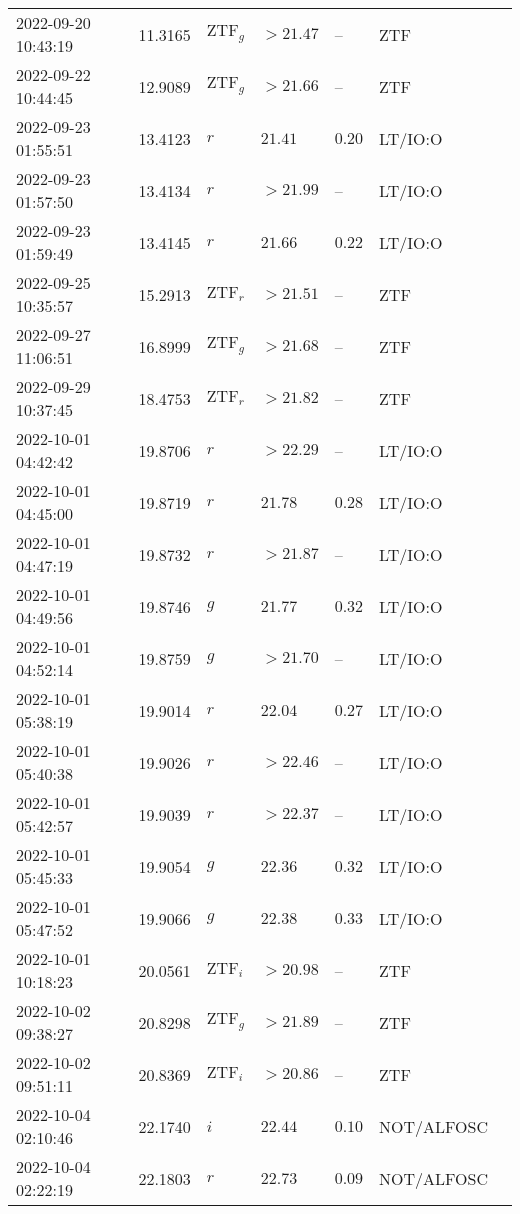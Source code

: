 \documentclass{nature_plusfigure}
\begin{document}
\begin{supplement}
\begin{center}
\begin{longtable}{lllllll}
2022-09-20 10:43:19 & 11.3165 & $\mathrm{ZTF}_{g}$ & $>21.47$ & -- & ZTF &  \\ 
2022-09-22 10:44:45 & 12.9089 & $\mathrm{ZTF}_{g}$ & $>21.66$ & -- & ZTF &  \\ 
2022-09-23 01:55:51 & 13.4123 & $r$ & $21.41$ & $0.20$ & LT/IO:O &  \\ 
2022-09-23 01:57:50 & 13.4134 & $r$ & $>21.99$ & -- & LT/IO:O &  \\ 
2022-09-23 01:59:49 & 13.4145 & $r$ & $21.66$ & $0.22$ & LT/IO:O &  \\ 
2022-09-25 10:35:57 & 15.2913 & $\mathrm{ZTF}_{r}$ & $>21.51$ & -- & ZTF &  \\ 
2022-09-27 11:06:51 & 16.8999 & $\mathrm{ZTF}_{g}$ & $>21.68$ & -- & ZTF &  \\ 
2022-09-29 10:37:45 & 18.4753 & $\mathrm{ZTF}_{r}$ & $>21.82$ & -- & ZTF &  \\ 
2022-10-01 04:42:42 & 19.8706 & $r$ & $>22.29$ & -- & LT/IO:O &  \\ 
2022-10-01 04:45:00 & 19.8719 & $r$ & $21.78$ & $0.28$ & LT/IO:O &  \\ 
2022-10-01 04:47:19 & 19.8732 & $r$ & $>21.87$ & -- & LT/IO:O &  \\ 
2022-10-01 04:49:56 & 19.8746 & $g$ & $21.77$ & $0.32$ & LT/IO:O &  \\ 
2022-10-01 04:52:14 & 19.8759 & $g$ & $>21.70$ & -- & LT/IO:O &  \\ 
2022-10-01 05:38:19 & 19.9014 & $r$ & $22.04$ & $0.27$ & LT/IO:O &  \\ 
2022-10-01 05:40:38 & 19.9026 & $r$ & $>22.46$ & -- & LT/IO:O &  \\ 
2022-10-01 05:42:57 & 19.9039 & $r$ & $>22.37$ & -- & LT/IO:O &  \\ 
2022-10-01 05:45:33 & 19.9054 & $g$ & $22.36$ & $0.32$ & LT/IO:O &  \\ 
2022-10-01 05:47:52 & 19.9066 & $g$ & $22.38$ & $0.33$ & LT/IO:O &  \\ 
2022-10-01 10:18:23 & 20.0561 & $\mathrm{ZTF}_{i}$ & $>20.98$ & -- & ZTF &  \\ 
2022-10-02 09:38:27 & 20.8298 & $\mathrm{ZTF}_{g}$ & $>21.89$ & -- & ZTF &  \\ 
2022-10-02 09:51:11 & 20.8369 & $\mathrm{ZTF}_{i}$ & $>20.86$ & -- & ZTF &  \\ 
2022-10-04 02:10:46 & 22.1740 & $i$ & $22.44$ & $0.10$ & NOT/ALFOSC &  \\ 
2022-10-04 02:22:19 & 22.1803 & $r$ & $22.73$ & $0.09$ & NOT/ALFOSC &  \\ 

\end{longtable}
\end{center}
\end{supplement}
\end{document}
